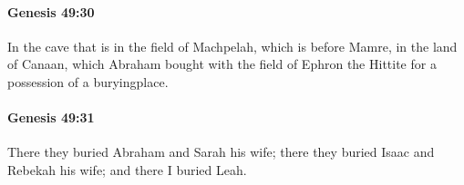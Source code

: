 		\paragraph{Genesis 49:30} %
			\label{GENESIS-49-30}

			In the cave that is in the field of Machpelah, which is before Mamre, in the land of Canaan, which Abraham bought with the field of Ephron the Hittite for a possession of a buryingplace.


		\paragraph{Genesis 49:31} %
			\label{GENESIS-49-31}

			There they buried Abraham and Sarah his wife; there they buried Isaac and Rebekah his wife; and there I buried Leah.



